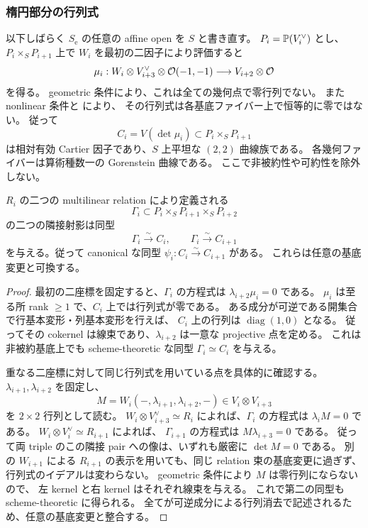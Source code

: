 \subsubsection{楕円部分の行列式}

以下しばらく $S_{\mathrm e}$ の任意の affine open を $S$ と書き直す。
$P_i=\mathbb P(V_i^{\vee})$ とし、$P_i\times_S P_{i+1}$ 上で $W_i$ を最初の二因子により評価すると
\begin{equation}\label{noeth-eq:relation-matrix}
 \mu_i:W_i\otimes V_{i+3}^{\vee}\otimes\mathcal O(-1,-1)
 \longrightarrow V_{i+2}\otimes\mathcal O
\end{equation}
を得る。
geometric 条件により、これは全ての幾何点で零行列でない。
また nonlinear 条件と \cite[\S5.4, 特に Lemma 5.4.10]{VdB2011} により、
その行列式は各基底ファイバー上で恒等的に零ではない。
従って
\[
 C_i=V(\det\mu_i)\subset P_i\times_S P_{i+1}
\]
は相対有効 Cartier 因子であり、$S$ 上平坦な $(2,2)$ 曲線族である。
各幾何ファイバーは算術種数一の Gorenstein 曲線である。
ここで非被約性や可約性を除外しない。

\begin{lemma}\label{noeth-lem:scheme-shift}
$R_i$ の二つの multilinear relation により定義される
\[
 \Gamma_i\subset P_i\times_S P_{i+1}\times_S P_{i+2}
\]
の二つの隣接射影は同型
\[
 \Gamma_i\xrightarrow{\sim}C_i,
 \qquad \Gamma_i\xrightarrow{\sim}C_{i+1}
\]
を与える。従って canonical な同型 $\psi_i:C_i\xrightarrow{\sim}C_{i+1}$ がある。
これらは任意の基底変更と可換する。
\end{lemma}

\begin{proof}
最初の二座標を固定すると、$\Gamma_i$ の方程式は
$\lambda_{i+2}\mu_i=0$ である。
$\mu_i$ は至る所 rank $\ge1$ で、$C_i$ 上では行列式が零である。
ある成分が可逆である開集合で行基本変形・列基本変形を行えば、
$C_i$ 上の行列は $\operatorname{diag}(1,0)$ となる。
従ってその cokernel は線束であり、$\lambda_{i+2}$ は一意な projective 点を定める。
これは非被約基底上でも scheme-theoretic な同型 $\Gamma_i\simeq C_i$ を与える。

重なる二座標に対して同じ行列式を用いている点を具体的に確認する。
$\lambda_{i+1},\lambda_{i+2}$ を固定し、
\[
 M=W_i(-,\lambda_{i+1},\lambda_{i+2},-)
 \in V_i\otimes V_{i+3}
\]
を $2\times2$ 行列として読む。
$W_i\otimes V_{i+3}^{\vee}\simeq R_i$ によれば、$\Gamma_i$ の方程式は
$\lambda_iM=0$ である。
$W_i\otimes V_i^{\vee}\simeq R_{i+1}$ によれば、
$\Gamma_{i+1}$ の方程式は $M\lambda_{i+3}=0$ である。
従って両 triple のこの隣接 pair への像は、いずれも厳密に $\det M=0$ である。
別の $W_{i+1}$ による $R_{i+1}$ の表示を用いても、同じ relation 束の基底変更に過ぎず、
行列式のイデアルは変わらない。
geometric 条件により $M$ は零行列にならないので、
左 kernel と右 kernel はそれぞれ線束を与える。
これで第二の同型も scheme-theoretic に得られる。
全てが可逆成分による行列消去で記述されるため、任意の基底変更と整合する。
\end{proof}

